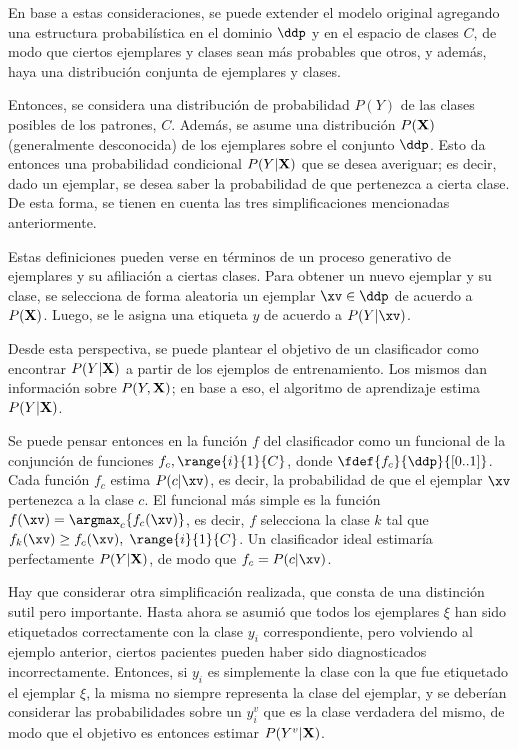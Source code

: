 En base a estas consideraciones, se puede extender el modelo original agregando una estructura probabilística en el dominio $\ddp$ y en el espacio de clases $C$, de modo que ciertos ejemplares y clases sean más probables que otros, y además, haya una distribución conjunta de ejemplares y clases. 

Entonces, se considera una distribución de probabilidad $P(Y)$ de las clases posibles de los patrones, $C$. Además, se asume una distribución $P(\mathbf{X})$ (generalmente desconocida) de los ejemplares sobre el conjunto $\ddp$. Esto da entonces una probabilidad condicional $P(Y | \mathbf{X} )$ que se desea averiguar; es decir, dado un ejemplar, se desea saber la probabilidad de que pertenezca a cierta clase. De esta forma, se tienen en cuenta las tres simplificaciones mencionadas anteriormente.

Estas definiciones pueden verse en términos de un proceso generativo de ejemplares y su afiliación a ciertas clases. Para obtener un nuevo ejemplar y su clase, se selecciona de forma aleatoria un ejemplar $\xv \in \ddp$ de acuerdo a $P(\mathbf{X})$. Luego, se le asigna una etiqueta $y$ de acuerdo a $P( Y | \xv )$.

Desde esta perspectiva, se puede plantear el objetivo de un clasificador como encontrar $P( Y | \mathbf{X})$ a partir de los ejemplos de entrenamiento. Los mismos dan información sobre $P(Y, \mathbf{X})$; en base a eso, el algoritmo de aprendizaje estima $P( Y | \mathbf{X})$. 

Se puede pensar entonces en la función $f$ del clasificador como un funcional de la conjunción de funciones $f_c, \range{i}{1}{C}$, donde $\fdef{f_c}{\ddp}{[0..1]}$. Cada función $f_c$ estima $P(c| \xv)$, es decir, la probabilidad de que el ejemplar $\xv$ pertenezca a la clase $c$. El funcional más simple es la función $f(\xv) =  \argmax_c \{ f_c(\xv) \} $, es decir, $f$ selecciona la clase $k$ tal que $f_k(\xv) \geq f_c(\xv), \; \range{i}{1}{C}$. Un clasificador ideal estimaría perfectamente $P(Y|\mathbf{X})$, de modo que $f_c=P(c|\xv)$.

Hay que considerar otra simplificación realizada, que consta de una distinción sutil pero importante. Hasta ahora se asumió que todos los ejemplares $\xi$ han sido etiquetados correctamente con la clase $y_i$ correspondiente, pero volviendo al ejemplo anterior, ciertos pacientes pueden haber sido diagnosticados incorrectamente. Entonces, si $y_i$ es simplemente la clase con la que fue etiquetado el ejemplar $\xi$, la misma no siempre representa la clase del ejemplar, y se deberían considerar las probabilidades sobre un $y_i^v$ que es la clase verdadera del mismo, de modo que el objetivo es entonces estimar $P(Y^v | \mathbf{X})$. 


